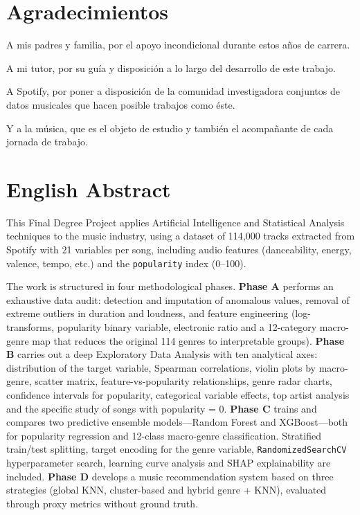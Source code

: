 \documentclass[12pt, a4paper, twoside]{book}
\theoremstyle{definition}
\begin{document}
\cleardoublepage

\chapter*{Agradecimientos}

A mis padres y familia, por el apoyo incondicional durante estos años de carrera.

A mi tutor, por su guía y disposición a lo largo del desarrollo de este trabajo.

A Spotify, por poner a disposición de la comunidad investigadora conjuntos de
datos musicales que hacen posible trabajos como éste.

Y a la música, que es el objeto de estudio y también el acompañante de cada
jornada de trabajo.

\cleardoublepage

\chapter*{English Abstract}

This Final Degree Project applies Artificial Intelligence and Statistical Analysis
techniques to the music industry, using a dataset of 114{,}000 tracks extracted
from Spotify with 21 variables per song, including audio features (danceability,
energy, valence, tempo, etc.) and the \texttt{popularity} index (0--100).

The work is structured in four methodological phases.
\textbf{Phase A} performs an exhaustive data audit: detection and imputation of
anomalous values, removal of extreme outliers in duration and loudness, and
feature engineering (log-transforms, popularity binary variable, electronic ratio
and a 12-category macro-genre map that reduces the original 114 genres to
interpretable groups).
\textbf{Phase B} carries out a deep Exploratory Data Analysis with ten analytical
axes: distribution of the target variable, Spearman correlations, violin plots by
macro-genre, scatter matrix, feature-vs-popularity relationships, genre radar charts,
confidence intervals for popularity, categorical variable effects, top artist analysis
and the specific study of songs with popularity = 0.
\textbf{Phase C} trains and compares two predictive ensemble models---Random
Forest and XGBoost---both for popularity regression and 12-class macro-genre
classification. Stratified train/test splitting, target encoding for the genre variable,
\texttt{RandomizedSearchCV} hyperparameter search, learning curve analysis and
SHAP explainability are included.
\textbf{Phase D} develops a music recommendation system based on three
strategies (global KNN, cluster-based and hybrid genre + KNN), evaluated through
proxy metrics without ground truth.
\end{document}
